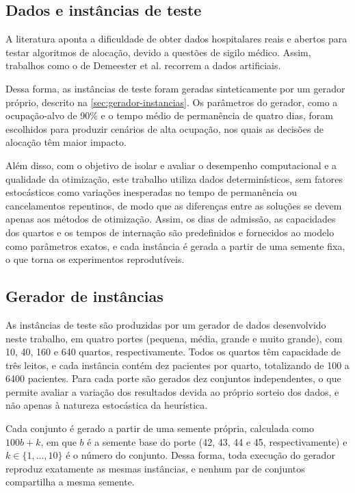 \subsection{Dados e instâncias de teste}

A literatura aponta a dificuldade de obter dados hospitalares reais e abertos para testar algoritmos de alocação, devido a questões de sigilo médico. Assim, trabalhos como o de Demeester et al. \cite{demeester2010hybrid} recorrem a dados artificiais.

Dessa forma, as instâncias de teste foram geradas sinteticamente por um gerador próprio, descrito na \autoref{sec:gerador-instancias}. Os parâmetros do gerador, como a ocupação-alvo de 90\% e o tempo médio de permanência de quatro dias, foram escolhidos para produzir cenários de alta ocupação, nos quais as decisões de alocação têm maior impacto.

Além disso, com o objetivo de isolar e avaliar o desempenho computacional e a qualidade da otimização, este trabalho utiliza dados determinísticos, sem fatores estocásticos como variações inesperadas no tempo de permanência ou cancelamentos repentinos, de modo que as diferenças entre as soluções se devem apenas aos métodos de otimização. Assim, os dias de admissão, as capacidades dos quartos e os tempos de internação são predefinidos e fornecidos ao modelo como parâmetros exatos, e cada instância é gerada a partir de uma semente fixa, o que torna os experimentos reprodutíveis.


\subsection{Gerador de instâncias}
\label{sec:gerador-instancias}

As instâncias de teste são produzidas por um gerador de dados desenvolvido neste trabalho, em quatro portes (pequena, média, grande e muito grande), com 10, 40, 160 e 640 quartos, respectivamente. Todos os quartos têm capacidade de três leitos, e cada instância contém dez pacientes por quarto, totalizando de 100 a 6400 pacientes. Para cada porte são gerados dez conjuntos independentes, o que permite avaliar a variação dos resultados devida ao próprio sorteio dos dados, e não apenas à natureza estocástica da heurística.

Cada conjunto é gerado a partir de uma semente própria, calculada como $100b + k$, em que $b$ é a semente base do porte (42, 43, 44 e 45, respectivamente) e $k \in \{1, \dots , 10\}$ é o número do conjunto. Dessa forma, toda execução do gerador reproduz exatamente as mesmas instâncias, e nenhum par de conjuntos compartilha a mesma semente.

